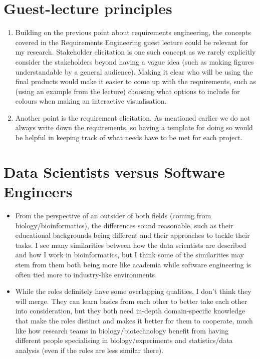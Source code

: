 \documentclass[11pt]{article}
\begin{document}
\section{Guest-lecture principles}

\begin{enumerate}
    \item Building on the previous point about requirements engineering, the concepts covered in the Requirements Engineering guest lecture could be relevant for my research. Stakeholder elicitation is one such concept as we rarely explicitly consider the stakeholders beyond having a vague idea (such as making figures understandable by a general audience). Making it clear who will be using the final products would make it easier to come up with the requirements, such as (using an example from the lecture) choosing what options to include for colours when making an interactive visualisation.

    \item Another point is the requirement elicitation. As mentioned earlier we do not always write down the requirements, so having a template for doing so would be helpful in keeping track of what needs have to be met for each project.
\end{enumerate}

\section{Data Scientists versus Software Engineers}

\begin{itemize}
    \item From the perspective of an outsider of both fields (coming from \\biology/bioinformatics), the differences sound reasonable, such as their educational backgrounds being different and their approaches to tackle their tasks. I see many similarities between how the data scientists are described and how I work in bioinformatics, but I think some of the similarities may stem from them both being more like academia while software engineering is often tied more to industry-like environments.

    \item While the roles definitely have some overlapping qualities, I don't think they will merge. They can learn basics from each other to better take each other into consideration, but they both need in-depth domain-specific knowledge that make the roles distinct and makes it better for them to cooperate, much like how research teams in biology/biotechnology benefit from having different people specialising in biology/experiments and statistics/data analysis (even if the roles are less similar there).
\end{itemize}
\end{document}
